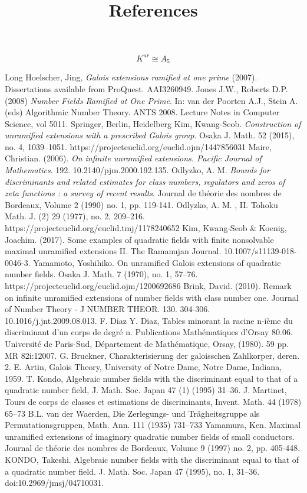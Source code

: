 \documentclass[preprint,12pt,reqno]{elsarticle}
\begin{document}
\begin{equation}
    K^{ur}\cong A_{5}
\end{equation}
\begin{thebibliography}{9}
\title{References}
Long Hoelscher, Jing, \textit{Galois extensions ramified at one prime} (2007). Dissertations available from ProQuest. AAI3260949. 
Jones J.W., Roberts D.P. (2008) \textit{Number Fields Ramified at One Prime}. In: van der Poorten A.J., Stein A. (eds) Algorithmic Number Theory. ANTS 2008. Lecture Notes in Computer Science, vol 5011. Springer, Berlin, Heidelberg
Kim, Kwang-Seob. \textit{Construction of unramified extensions with a prescribed Galois group}. Osaka J. Math. 52 (2015), no. 4, 1039--1051. https://projecteuclid.org/euclid.ojm/1447856031
Maire, Christian. (2006). \textit{On infinite unramified extensions. Pacific Journal of Mathematics}. 192. 10.2140/pjm.2000.192.135. 
Odlyzko, A. M. \textit{Bounds for discriminants and related estimates for class numbers, regulators and zeros of zeta functions : a survey of recent results}. Journal de théorie des nombres de Bordeaux, Volume 2 (1990) no. 1, pp. 119-141. 
Odlyzko, A. M. , II. Tohoku Math. J. (2) 29 (1977), no. 2, 209--216.  https://projecteuclid.org/euclid.tmj/1178240652
Kim, Kwang-Seob & Koenig, Joachim. (2017). Some examples of quadratic fields with finite nonsolvable maximal unramified extensions II. The Ramanujan Journal. 10.1007/s11139-018-0046-3. 
Yamamoto, Yoshihiko. On unramified Galois extensions of quadratic number fields. Osaka J. Math. 7 (1970), no. 1, 57--76. https://projecteuclid.org/euclid.ojm/1200692686
Brink, David. (2010). Remark on infinite unramified extensions of number fields with class number one. Journal of Number Theory - J NUMBER THEOR. 130. 304-306. 10.1016/j.jnt.2009.08.013. 
 F. Diaz Y. Diaz, Tables minorant la racine n-ième du discriminant d'un corps de degré n. Publications Mathématiques d'Orsay 80.06. Université de Paris-Sud, Département de Mathématique, Orsay, (1980). 59 pp. MR 82i:12007.
 G. Bruckner, Charakterisierung der galoisschen Zahlkorper, deren. 2. E. Artin, Galois Theory, University of Notre Dame, Notre Dame, Indiana, 1959.
 T. Kondo, Algebraic number fields with the discriminant equal to that of a quadratic number field, J. Math. Soc. Japan 47 (1)
(1995) 31–36.
 J. Martinet, Tours de corps de classes et estimations de discriminants, Invent. Math. 44 (1978) 65–73
 B.L. van der Waerden, Die Zerlegungs- und Trägheitsgruppe als Permutationsgruppen, Math. Ann. 111 (1935) 731–733
 Yamamura, Ken. Maximal unramified extensions of imaginary quadratic number fields of small conductors. Journal de théorie des nombres de Bordeaux, Volume 9 (1997) no. 2, pp. 405-448.
 KONDO, Takeshi. Algebraic number fields with the discriminant equal to that of a quadratic number field. J. Math. Soc. Japan 47 (1995), no. 1, 31--36. doi:10.2969/jmsj/04710031.
\end{thebibliography}
\end{document}
